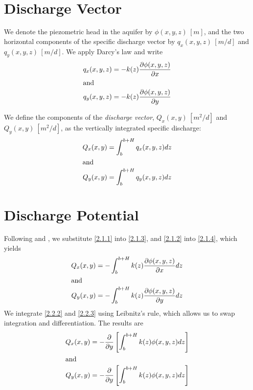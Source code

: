 \documentclass[12pt]{report}
\providecommand{\pderiv}[2]{\frac{\mathinner{\partial#1}}{\mathinner{\partial#2}}}
\begin{document}
\section{Discharge Vector}
We denote the piezometric head in the aquifer by $\phi(x,y,z)~[m]$, and the two horizontal components of the specific discharge vector by $q_x(x,y,z)~[m/d]$ and $q_y(x,y,z)~[m/d]$. We apply Darcy's law \citep[e.g.][Section 2.1]{Haitjema1995} and write
%
\begin{align}
    q_x(x,y,z) &= -k(z) \pderiv{\phi(x,y,z)}{x} \label{2.1.1}\\
    \intertext{and}
    q_y(x,y,z) &= -k(z) \pderiv{\phi(x,y,z)}{y} \label{2.1.2}
\end{align}

We define the components of the {\em discharge vector}, $Q_x(x,y)~[m^2/d]$ and $Q_y(x,y)~[m^2/d]$, as the vertically integrated specific discharge:
%
\begin{align}
    Q_x(x,y) &= \int_{b}^{b+H} q_x(x,y,z) dz \label{2.1.3}\\
    \intertext{and}
    Q_y(x,y) &= \int_{b}^{b+H} q_y(x,y,z) dz \label{2.1.4}
\end{align}


\section{Discharge Potential}\label{2.2.1}
Following \citet[p. 77-78]{Bear1979, Bear2007} and \citet{Strack06}, we substitute \eqref{2.1.1} into \eqref{2.1.3}, and \eqref{2.1.2} into \eqref{2.1.4}, which yields
%
\begin{align}
    Q_x(x,y) &= -\int_{b}^{b+H} k(z) \pderiv{\phi(x,y,z)}{x} dz \label{2.2.2}\\
    \intertext{and}
    Q_y(x,y) &= -\int_{b}^{b+H} k(z) \pderiv{\phi(x,y,z)}{y} dz \label{2.2.3}
\end{align}
%
We integrate \eqref{2.2.2} and \eqref{2.2.3} using Leibnitz's rule, which allows us to swap integration and differentiation. The results are
%
\begin{align}
    Q_x(x,y) &= -\pderiv{}{y} \left[ \int_{b}^{b+H} k(z) \phi(x,y,z) dz \right] \label{2.2.4}\\
        \intertext{and}
    Q_y(x,y) &= -\pderiv{}{y} \left[ \int_{b}^{b+H} k(z) \phi(x,y,z) dz \right] \label{2.2.5}
\end{align}
\end{document}
